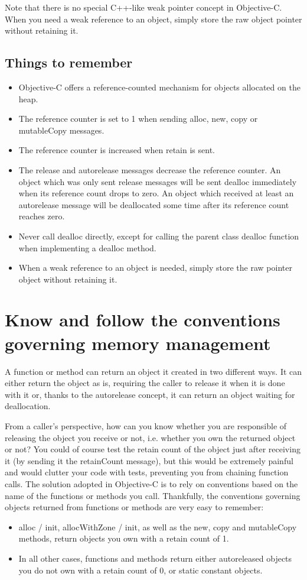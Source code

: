 Note that there is no special C++-like weak pointer concept in Objective-C. When you need a weak reference to an object, simply store the raw object pointer without retaining it.

\subsection{Things to remember}
\begin{itemize}
\item Objective-C offers a reference-counted mechanism for objects allocated on the heap.
\item The reference counter is set to 1 when sending alloc, new, copy or mutableCopy messages.
\item The reference counter is increased when retain is sent.
\item The release and autorelease messages decrease the reference counter. An object which was only sent release messages will be sent dealloc immediately when its reference count drops to zero. An object which received at least an autorelease message will be deallocated some time after its reference count reaches zero.
\item Never call dealloc directly, except for calling the parent class dealloc function when implementing a dealloc method.
\item When a weak reference to an object is needed, simply store the raw pointer object without retaining it.
\end{itemize}

\section{Know and follow the conventions governing memory management}\label{sec:refCountingConventions}
A function or method can return an object it created in two different ways. It can either return the object as is, requiring the caller to release it when it is done with it or, thanks to the autorelease concept, it can return an object waiting for deallocation.

From a caller's perspective, how can you know whether you are responsible of releasing the object you receive or not, i.e. whether you own the returned object or not? You could of course test the retain count of the object just after receiving it (by sending it the retainCount message), but this would be extremely painful and would clutter your code with tests, preventing you from chaining function calls. The solution adopted in Objective-C is to rely on conventions based on the name of the functions or methods you call. Thankfully, the conventions governing objects returned from functions or methods are very easy to remember:
\begin{itemize}
\item alloc / init, allocWithZone / init, as well as the new, copy and mutableCopy methods, return objects you own with a retain count of 1.
\item In all other cases, functions and methods return either autoreleased objects you do not own with a retain count of 0, or static constant objects.
\end{itemize}

